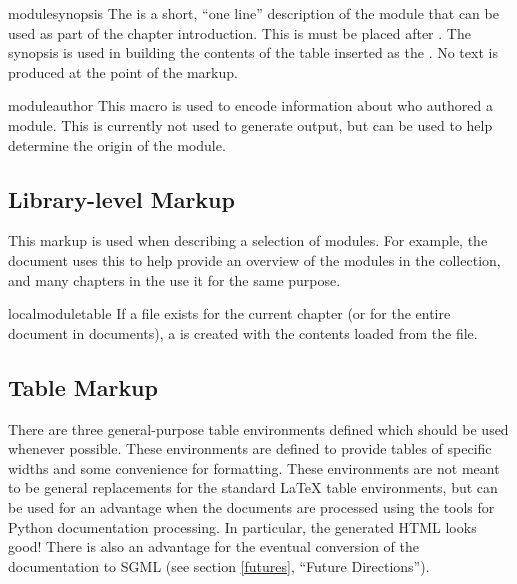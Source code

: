 \documentclass{howto}
\begin{document}
  \begin{macrodesc}{modulesynopsis}{}
    The  is a short, ``one line'' description of the
    module that can be used as part of the chapter introduction.
    This is must be placed after .
    The synopsis is used in building the contents of the table
    inserted as the .  No text is
    produced at the point of the markup.
  \end{macrodesc}

  \begin{macrodesc}{moduleauthor}{}
    This macro is used to encode information about who authored a
    module.  This is currently not used to generate output, but can be
    used to help determine the origin of the module.
  \end{macrodesc}


  \subsection{Library-level Markup}

    This markup is used when describing a selection of modules.  For
    example, the  document uses this to help provide an overview of the
    modules in the collection, and many chapters in the
     use it for
    the same purpose.

  \begin{macrodesc}{localmoduletable}{}
    If a  file exists for the current
    chapter (or for the entire document in  documents), a
     is created with the contents loaded from the
     file.
  \end{macrodesc}


  \subsection{Table Markup}

    There are three general-purpose table environments defined which
    should be used whenever possible.  These environments are defined
    to provide tables of specific widths and some convenience for
    formatting.  These environments are not meant to be general
    replacements for the standard \LaTeX{} table environments, but can
    be used for an advantage when the documents are processed using
    the tools for Python documentation processing.  In particular, the
    generated HTML looks good!  There is also an advantage for the
    eventual conversion of the documentation to SGML (see section
    \ref{futures}, ``Future Directions'').
\end{document}

